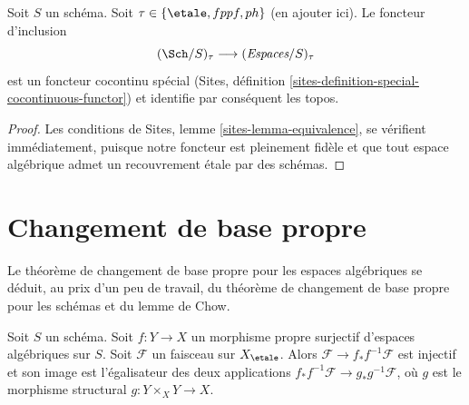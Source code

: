 \begin{lemma}
\label{lemma-compare-cohomology-other-topologies}
Soit $S$ un schéma. Soit $\tau \in \{\etale, fppf, ph\}$ (en ajouter ici).
Le foncteur d'inclusion
$$
(\Sch/S)_\tau \longrightarrow (\textit{Espaces}/S)_\tau
$$
est un foncteur cocontinu spécial
(Sites, définition \ref{sites-definition-special-cocontinuous-functor})
et identifie par conséquent les topos.
\end{lemma}

\begin{proof}
Les conditions de Sites, lemme \ref{sites-lemma-equivalence},
se vérifient immédiatement, puisque notre foncteur est pleinement fidèle
et que tout espace algébrique admet un recouvrement étale par des schémas.
\end{proof}







\section{Changement de base propre}
\label{section-proper-base-change}

\noindent
Le théorème de changement de base propre pour les espaces algébriques se déduit,
au prix d'un peu de travail, du théorème de changement de base propre
pour les schémas et du lemme de Chow.

\begin{lemma}
\label{lemma-surjective-proper}
Soit $S$ un schéma. Soit $f : Y \to X$ un morphisme propre surjectif
d'espaces algébriques sur $S$. Soit $\mathcal{F}$ un faisceau sur $X_\etale$.
Alors $\mathcal{F} \to f_*f^{-1}\mathcal{F}$ est injectif et son
image est l'égalisateur des deux applications
$f_*f^{-1}\mathcal{F} \to g_*g^{-1}\mathcal{F}$, où
$g$ est le morphisme structural $g : Y \times_X Y \to X$.
\end{lemma}

